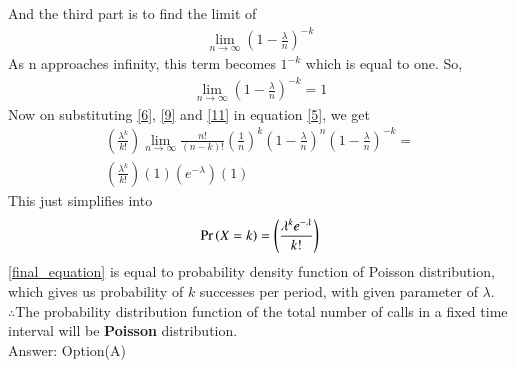 \documentclass[journal,12pt,twocolumn]{IEEEtran}
\begin{document}
And the third part is to find the limit of 
\begin{align}
    \lim_{n \to \infty}\left(1-\frac{\lambda}{n}\right)^{-k}
\end{align}
As n approaches infinity, this term becomes $1^{-k}$ which is equal to one.
So,
\begin{align}\label{11}
    \lim_{n \to \infty}\left(1-\frac{\lambda}{n}\right)^{-k}=1
\end{align}
Now on substituting \ref{6}, \ref{9} and \ref{11} in equation \ref{5}, we get
\begin{multline}  
    \left(\frac{\lambda^k}{k!}\right)\lim_{n \to \infty}\frac{n!}{(n-k)!}\left(\frac{1}{n}\right)^k\left(1-\frac{\lambda}{n}\right)^n\left(1-\frac{\lambda}{n}\right)^{-k}=\\
    \left(\frac{\lambda^k}{k!}\right)(1)\left(e^{-\lambda}\right)(1)
\end{multline}
This just simplifies into
\begin{align}\label{final_equation}
    \Pr\left(X=k\right)=\left(\frac{\lambda^k e^{-\lambda}}{k!}\right)
\end{align}
   \ref{final_equation} is equal to probability density function of Poisson distribution, which gives us probability of $k$ successes per period, with given parameter of $\lambda$.\\
   
   $\therefore $The probability distribution function of the total
number of calls in a fixed time interval will be \textbf{Poisson} distribution.\\
Answer: Option(A)
\end{document}
